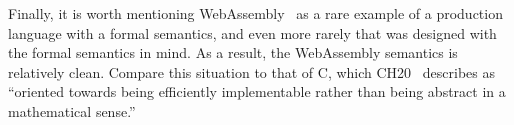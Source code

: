 Finally, it is worth mentioning WebAssembly~\cite{haas:wasm} as a rare example
of a production language with a formal semantics, and even more rarely that was
designed with the formal semantics in mind. As a result, the WebAssembly
semantics is relatively clean. Compare this situation to that of C, which
CH20~\cite{krebbers:c-coq} describes as ``oriented towards being efficiently
implementable rather than being abstract in a mathematical sense.''
